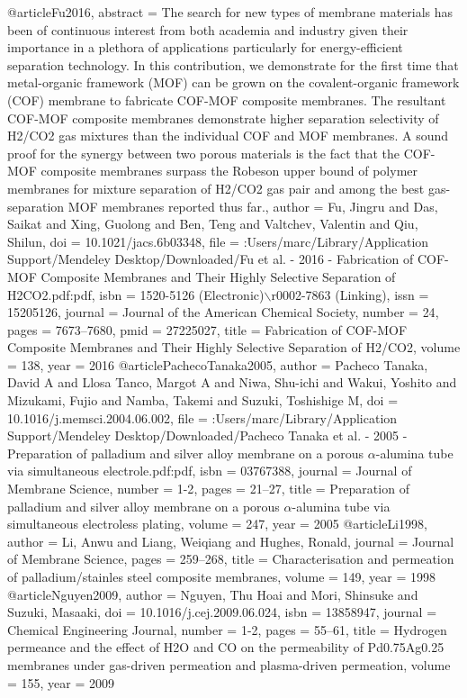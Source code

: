 @article{Fu2016,
abstract = {The search for new types of membrane materials has been of continuous interest from both academia and industry given their importance in a plethora of applications particularly for energy-efficient separation technology. In this contribution, we demonstrate for the first time that metal-organic framework (MOF) can be grown on the covalent-organic framework (COF) membrane to fabricate COF-MOF composite membranes. The resultant COF-MOF composite membranes demonstrate higher separation selectivity of H2/CO2 gas mixtures than the individual COF and MOF membranes. A sound proof for the synergy between two porous materials is the fact that the COF-MOF composite membranes surpass the Robeson upper bound of polymer membranes for mixture separation of H2/CO2 gas pair and among the best gas-separation MOF membranes reported thus far.},
author = {Fu, Jingru and Das, Saikat and Xing, Guolong and Ben, Teng and Valtchev, Valentin and Qiu, Shilun},
doi = {10.1021/jacs.6b03348},
file = {:Users/marc/Library/Application Support/Mendeley Desktop/Downloaded/Fu et al. - 2016 - Fabrication of COF-MOF Composite Membranes and Their Highly Selective Separation of H2CO2.pdf:pdf},
isbn = {1520-5126 (Electronic)$\backslash$r0002-7863 (Linking)},
issn = {15205126},
journal = {Journal of the American Chemical Society},
number = {24},
pages = {7673--7680},
pmid = {27225027},
title = {{Fabrication of COF-MOF Composite Membranes and Their Highly Selective Separation of H2/CO2}},
volume = {138},
year = {2016}
}
@article{PachecoTanaka2005,
author = {{Pacheco Tanaka}, David A and {Llosa Tanco}, Margot A and Niwa, Shu-ichi and Wakui, Yoshito and Mizukami, Fujio and Namba, Takemi and Suzuki, Toshishige M},
doi = {10.1016/j.memsci.2004.06.002},
file = {:Users/marc/Library/Application Support/Mendeley Desktop/Downloaded/Pacheco Tanaka et al. - 2005 - Preparation of palladium and silver alloy membrane on a porous $\alpha$-alumina tube via simultaneous electrole.pdf:pdf},
isbn = {03767388},
journal = {Journal of Membrane Science},
number = {1-2},
pages = {21--27},
title = {{Preparation of palladium and silver alloy membrane on a porous $\alpha$-alumina tube via simultaneous electroless plating}},
volume = {247},
year = {2005}
}
@article{Li1998,
author = {Li, Anwu and Liang, Weiqiang and Hughes, Ronald},
journal = {Journal of Membrane Science},
pages = {259--268},
title = {{Characterisation and permeation of palladium/stainles steel composite membranes}},
volume = {149},
year = {1998}
}
@article{Nguyen2009,
author = {Nguyen, Thu Hoai and Mori, Shinsuke and Suzuki, Masaaki},
doi = {10.1016/j.cej.2009.06.024},
isbn = {13858947},
journal = {Chemical Engineering Journal},
number = {1-2},
pages = {55--61},
title = {{Hydrogen permeance and the effect of H2O and CO on the permeability of Pd0.75Ag0.25 membranes under gas-driven permeation and plasma-driven permeation}},
volume = {155},
year = {2009}
}

